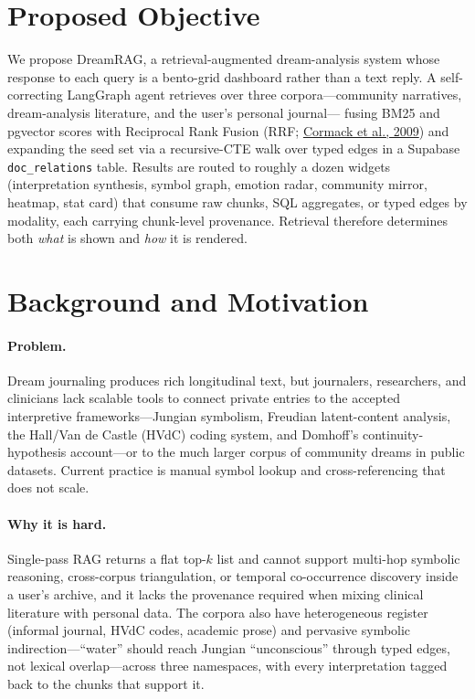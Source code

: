 \documentclass[paper=a4, fontsize=11pt]{scrartcl}
\author{
    \textbf{Gin Fu, Shiran Wang} \\
    \href{mailto:fu.jingyi2@northeastern.edu}{fu.jingyi2@northeastern.edu}, \href{mailto:wang.shira@northeastern.edu}{wang.shira@northeastern.edu} \\
    \href{https://github.com/blueif16/dreamrag}{github.com/blueif16/dreamrag}
}
\begin{document}
\maketitle

\section{Proposed Objective}

We propose DreamRAG, a retrieval-augmented dream-analysis system whose
response to each query is a bento-grid dashboard rather than a text reply. A
self-correcting LangGraph agent retrieves over three corpora---community
narratives, dream-analysis literature, and the user's personal journal---
fusing BM25 and pgvector scores with Reciprocal Rank Fusion (RRF;
\href{https://doi.org/10.1145/1571941.1572114}{Cormack et al., 2009}) and
expanding the seed set via a recursive-CTE walk over typed edges in a
Supabase \texttt{doc\_relations} table. Results are routed to roughly a
dozen widgets (interpretation synthesis, symbol graph, emotion radar,
community mirror, heatmap, stat card) that consume raw chunks, SQL
aggregates, or typed edges by modality, each carrying chunk-level
provenance. Retrieval therefore determines both \emph{what} is shown and
\emph{how} it is rendered.

\section{Background and Motivation}

\paragraph{Problem.}
Dream journaling produces rich longitudinal text, but journalers,
researchers, and clinicians lack scalable tools to connect private entries
to the accepted interpretive frameworks---Jungian symbolism, Freudian
latent-content analysis, the Hall/Van de Castle (HVdC) coding system, and
Domhoff's continuity-hypothesis account---or to the much larger corpus of
community dreams in public datasets. Current practice is manual symbol
lookup and cross-referencing that does not scale.

\paragraph{Why it is hard.}
Single-pass RAG returns a flat top-$k$ list and cannot support multi-hop
symbolic reasoning, cross-corpus triangulation, or temporal co-occurrence
discovery inside a user's archive, and it lacks the provenance required
when mixing clinical literature with personal data. The corpora also have
heterogeneous register (informal journal, HVdC codes, academic prose) and
pervasive symbolic indirection---``water'' should reach Jungian
``unconscious'' through typed edges, not lexical overlap---across three
namespaces, with every interpretation tagged back to the chunks that
support it.
\end{document}

